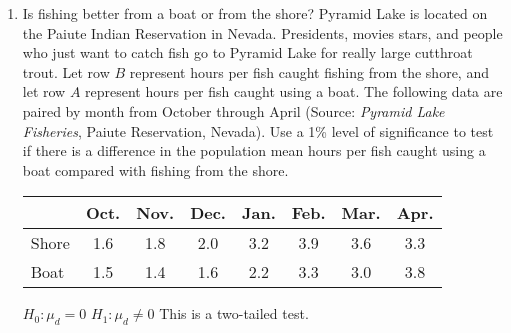 \documentclass{article}
\newcommand{\answer}[1]{\color{white}#1}
\begin{document}
\begin{enumerate}
\begin{enumerate}
        \vfill
        
        \item Compute the test statistic $t$ and the corresponding $P$-value.
        
        
        {\answer Using \texttt{T-Test} with $\mu_0 = 0$, \texttt{List:} $L_3$, \texttt{Freq: 1} and $\mu: < \mu_0$, we get $t\approx -1.3856$ and $P \approx 0.1016$.}
        \vfill
        
        \item What conclusion do you make based on this hypothesis test?
        
        {\answer Since $P > \alpha$, we fail to reject $H_0$. This means we have insufficient evidence to support the claim that the mean deposit of banks today is greater than the mean deposit three years ago.}
        
        \vfill
        
    \end{enumerate}

\newpage

\item Is fishing better from a boat or from the shore? Pyramid Lake is located on the Paiute Indian Reservation in Nevada. Presidents, movies stars, and people who just want to catch fish go to Pyramid Lake for really large cutthroat trout.  Let row $B$ represent hours per fish caught fishing from the shore, and let row $A$ represent hours per fish caught using a boat. The following data are paired by month from October through April (Source: {\em Pyramid Lake Fisheries}, Paiute Reservation, Nevada). Use a 1\% level of significance to test if there is a difference in the population mean hours per fish caught using a boat compared with fishing from the shore.  

\begin{center}
\begin{tabular}{l|ccccccc}

& Oct. & Nov. & Dec. & Jan. & Feb. & Mar. & Apr.  \\
\hline
Shore & 1.6 & 1.8 & 2.0 & 3.2 & 3.9 & 3.6 & 3.3  \\
\hline
Boat & 1.5 & 1.4 & 1.6 & 2.2 & 3.3 & 3.0 & 3.8  \\
\hline
\end{tabular}
\end{center} 
	
{\answer 
$H_0: \mu_d = 0$  
$H_1: \mu_d \neq 0$  
This is a two-tailed test.  

}
\end{enumerate}
\end{document}

